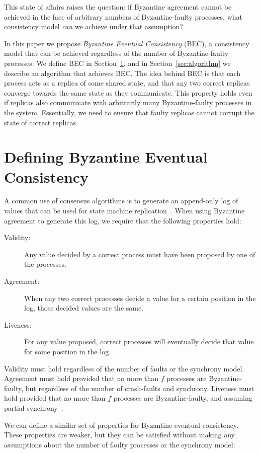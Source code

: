 \documentclass[manuscript,anonymous]{acmart}
\begin{document}
This state of affairs raises the question: if Byzantine agreement cannot be achieved in the face of arbitrary numbers of Byzantine-faulty processes, what consistency model \emph{can} we achieve under that assumption?

In this paper we propose \emph{Byzantine Eventual Consistency} (BEC), a consistency model that can be achieved regardless of the number of Byzantine-faulty processes.
We define BEC in Section~\ref{sec:properties}, and in Section~\ref{sec:algorithm} we describe an algorithm that achieves BEC.
The idea behind BEC is that each process acts as a replica of some shared state, and that any two correct replicas converge towards the same state as they communicate.
This property holds even if replicas also communicate with arbitrarily many Byzantine-faulty processes in the system.
Essentially, we need to ensure that faulty replicas cannot corrupt the state of correct replicas.

\section{Defining Byzantine Eventual Consistency}\label{sec:properties}

A common use of consensus algorithms is to generate an append-only log of values that can be used for state machine replication~\cite{Schneider:1990}.
When using Byzantine agreement to generate this log, we require that the following properties hold:

\begin{description}
\item[Validity:] Any value decided by a correct process must have been proposed by one of the processes.
\item[Agreement:] When any two correct processes decide a value for a certain position in the log, those decided values are the same.
\item[Liveness:] For any value proposed, correct processes will eventually decide that value for some position in the log.
\end{description}

Validity must hold regardless of the number of faults or the synchrony model.
Agreement must hold provided that no more than $f$ processes are Byzantine-faulty, but regardless of the number of crash-faults and synchrony. 
Liveness must hold provided that no more than $f$ processes are Byzantine-faulty, and assuming partial synchrony~\cite{Dwork:1988}.

We can define a similar set of properties for Byzantine eventual consistency.
These properties are weaker, but they can be satisfied without making any assumptions about the number of faulty processes or the synchrony model:
\end{document}

